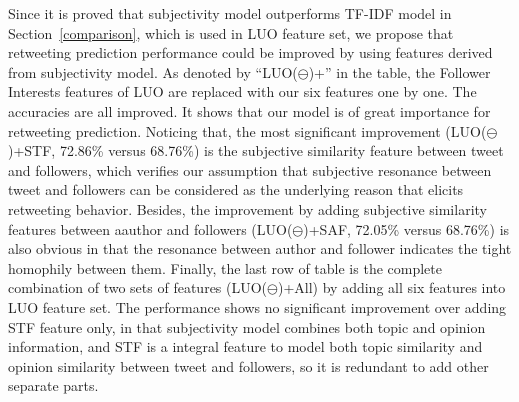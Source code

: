 \documentclass[twocolumn]{svjour3}          %
\begin{document}
Since it is proved that subjectivity model outperforms TF-IDF model in Section~\ref{comparison}, which is used in LUO feature set, we propose that retweeting prediction performance could be improved by using features derived from subjectivity model. 
As denoted by ``LUO($ \ominus $)+'' in the table, the Follower Interests features of LUO are replaced with our six features one by one. 
The accuracies are all improved. It shows that our model is of great importance for retweeting prediction. 
Noticing that, the most significant improvement (LUO($ \ominus $)+STF, 72.86\% versus 68.76\%) is the subjective similarity feature between tweet and followers, which verifies our assumption that subjective resonance between tweet and followers can be considered as the underlying reason that elicits retweeting behavior. 
Besides, the improvement by adding subjective similarity features between aauthor and followers (LUO($ \ominus $)+SAF, 72.05\% versus 68.76\%) is also obvious in that the resonance between author and follower indicates the tight homophily between them. 
Finally, the last row of table is the complete combination of two sets of features (LUO($ \ominus $)+All) by adding all six features into LUO feature set. 
The performance shows no significant improvement over adding STF feature only, in that subjectivity model combines both topic and opinion information, and STF is a integral feature to model both topic similarity and opinion similarity between tweet and followers, so it is redundant to add other separate parts. 
\end{document}
